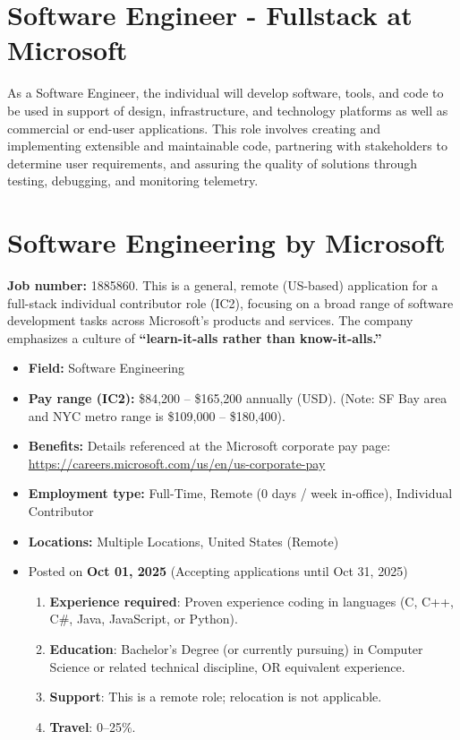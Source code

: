 \documentclass[11pt]{article}
\begin{document}

\section*{Software Engineer - Fullstack at Microsoft}

As a Software Engineer, the individual will develop software, tools, and 
code to be used in support of design, infrastructure, and technology 
platforms as well as commercial or end-user applications. This role involves 
creating and implementing extensible and maintainable code, partnering with 
stakeholders to determine user requirements, and assuring the quality of 
solutions through testing, debugging, and monitoring telemetry.

\section*{Software Engineering by \textbf{Microsoft}}
\textbf{Job number:} 1885860. This is a general, remote (US-based) 
application for a full-stack individual contributor role (IC2), 
focusing on a broad range of software development tasks across 
Microsoft's products and services. The company emphasizes a culture of 
\textbf{``learn-it-alls rather than know-it-alls.''}

\begin{itemize}
  \item \textbf{Field:} Software Engineering
  \item \textbf{Pay range (IC2):} \$84,200 -- \$165,200 annually (USD). 
    (Note: SF Bay area and NYC metro range is \$109,000 -- \$180,400).
  \item \textbf{Benefits:} Details referenced at the Microsoft corporate pay 
    page: \url{https://careers.microsoft.com/us/en/us-corporate-pay}
  \item \textbf{Employment type:} Full-Time, Remote (0 days / week 
    in-office), Individual Contributor
  \item \textbf{Locations:} Multiple Locations, United States (Remote)
  \item Posted on \textbf{Oct 01, 2025} (Accepting applications until 
    Oct 31, 2025)
  \begin{enumerate}[label=\arabic*., leftmargin=*]
    \item \textbf{Experience required}: Proven experience coding in 
      languages (C, C++, C\#, Java, JavaScript, or Python).
    \item \textbf{Education}: Bachelor's Degree (or currently pursuing) 
      in Computer Science or related technical discipline, OR equivalent 
      experience.
    \item \textbf{Support}: This is a remote role; relocation is not 
      applicable.
    \item \textbf{Travel}: 0--25\%.
  \end{enumerate}
\end{itemize}
\end{document}
